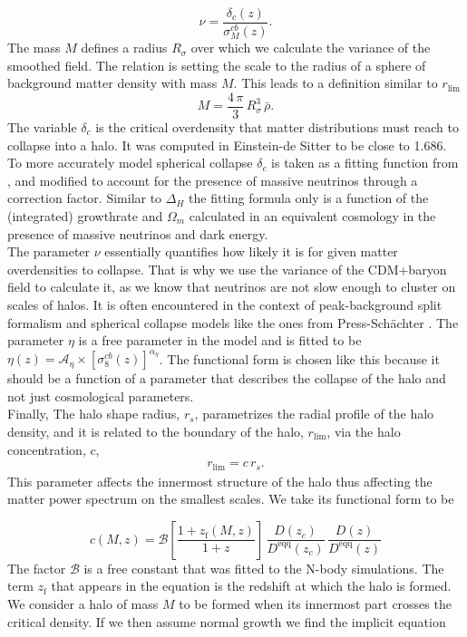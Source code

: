 \documentclass[../main.tex]{subfiles}
\begin{document}
\begin{equation}
\nu = \frac{\delta_c(z)}{\sigma^{cb}_M(z)}.
\end{equation}
The mass $M$ defines a radius $R_\sigma$ over which we calculate the variance of the smoothed field. The relation is setting the scale to the radius of a sphere of background matter density with mass $M$. This leads to a definition similar to $r_\mathrm{lim}$ \begin{equation*}
    M =  \frac{4\,\pi}{3}\,R_\sigma^3\,\bar{\rho}.
\end{equation*}
The variable $\delta_c$ is the critical overdensity that matter distributions must reach to collapse into a halo. It was computed in Einstein-de Sitter to be close to 1.686. To more accurately model spherical collapse $\delta_c$ is taken as a fitting function from \cite{Nakamura_1997}, and modified to account for the presence of massive neutrinos through a correction factor. Similar to $\Delta_H$ the fitting formula only is a function of the (integrated) growthrate and $\Omega_m$ calculated in an equivalent cosmology in the presence of massive neutrinos and dark energy.\\
The parameter $\nu$ essentially quantifies how likely it is for given matter overdensities to collapse. That is why we use the variance of the CDM+baryon field to calculate it, as we know that neutrinos are not slow enough to cluster on scales of halos. It is often encountered in the context of peak-background split formalism and spherical collapse models like the ones from Press-Schächter \cite{1974ApJ...187..425P}. The parameter $\eta$ is a free parameter in the \hmcode model and is fitted to be $\eta(z)=\mathcal{A}_\eta\times\left[\sigma_8^{cb}(z)\right]^{\alpha_\eta}$. The functional form is chosen like this because it should be a function of a parameter that describes the collapse of the halo and not just cosmological parameters.\\
Finally, The halo shape radius, $r_s$, parametrizes the radial profile of the halo density, and it is related to the boundary of the halo, $r_\mathrm{lim}$, via the halo concentration, $c$, \begin{align*}
    r_\mathrm{lim} = c\,r_s.
\end{align*}
This parameter affects the innermost structure of the halo thus affecting the matter power spectrum on the smallest scales. We take its functional form to be

\begin{equation}
    c(M,z) = \mathcal{B}\left[\frac{1+z_\mathrm{f}(M,z)}{1+z}\right]\,\frac{D(z_c)}{D^\mathrm{eqq}(z_c)}\,\frac{D(z)}{D^\mathrm{eqq}(z)}
\end{equation}
The factor $\mathcal{B}$ is a free constant that was fitted to the N-body simulations. The term $z_\mathrm{f}$ that appears in the equation is the redshift at which the halo is formed. We consider a halo of mass $M$ to be formed when its innermost part crosses the critical density. If we then assume normal growth we find the implicit equation
\end{document}
